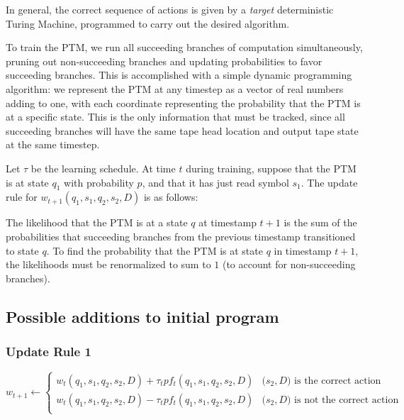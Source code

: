 \documentclass{article}
\begin{document}
In general, the correct sequence of actions is given by a \textit{target} deterministic Turing Machine, programmed to carry out the desired algorithm.


To train the PTM, we run all succeeding branches of computation simultaneously, pruning out non-succeeding branches and updating probabilities to favor succeeding branches. This is accomplished with a simple dynamic programming algorithm: we represent the PTM at any timestep as a vector of real numbers adding to one, with each coordinate representing the probability that the PTM is at a specific state. This is the only information that must be tracked, since all succeeding branches will have the same tape head location and output tape state at the same timestep.

Let $\tau$ be the learning schedule. At time $t$ during training, suppose that the PTM is at state $q_1$ with probability $p$, and that it has just read symbol $s_1$. The update rule for $w_{t+1}(q_1, s_1, q_2, s_2, D)$ is as follows:

The likelihood that the PTM is at a state $q$ at timestamp $t+1$ is the sum of the probabilities that succeeding branches from the previous timestamp transitioned to state $q$. To find the probability that the PTM is at state $q$ in timestamp $t+1$, the likelihoods must be renormalized to sum to $1$ (to account for non-succeeding branches).

\subsection{Possible additions to initial program}

\subsubsection{Update Rule 1}

\[ w_{t+1}\leftarrow 
\begin{cases}
    w_t(q_1, s_1, q_2, s_2, D) + \tau_tpf_t(q_1, s_1, q_2, s_2, D) & \text{($s_2, D$) is the correct action}\\
    w_t(q_1, s_1, q_2, s_2, D) - \tau_tpf_t(q_1, s_1, q_2, s_2, D) & \text{($s_2, D$) is not the correct action}\\
\end{cases}
\]
\end{document}
